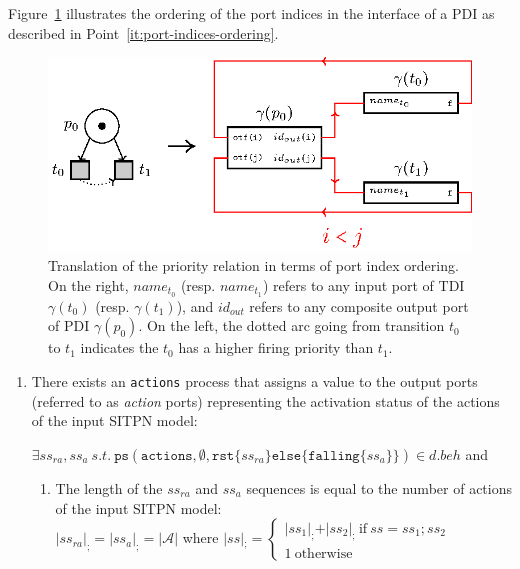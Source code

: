 \begin{definition}
  \bigskip

  Figure~\ref{fig:gen-prio-order} illustrates the ordering of the port
  indices in the interface of a PDI as described in
  Point~\ref{it:port-indices-ordering}.

  \begin{figure}[h]
    \centering
    \includegraphics[keepaspectratio,width=.8\textwidth]{gen-prio-order.eps}
    \caption{Translation of the priority relation in terms of port
      index ordering. On the right, $name_{t_0}$ (resp. $name_{t_1}$)
      refers to any input port of TDI $\gamma(t_0)$
      (resp. $\gamma(t_1)$), and $id_{out}$ refers to any composite
      output port of PDI $\gamma(p_0)$. On the left, the dotted arc
      going from transition $t_0$ to $t_1$ indicates the $t_0$ has a
      higher firing priority than $t_1$. }
    \label{fig:gen-prio-order}
  \end{figure}

  \begin{enumerate}[resume]
  \item\label{it:actions} There exists an \texttt{actions} process
    that assigns a value to the output ports (referred to as
    \textit{action} ports) representing the activation status of the
    actions of the input SITPN model:
    
    $\exists{}ss_{ra},ss_{a}~s.t.~\mathtt{ps}(\mathtt{actions},\emptyset,\mathtt{rst}\{ss_{ra}\}\mathtt{else}\{\mathtt{falling}\{ss_a\}\})\in{}d.beh$
    and
    \begin{enumerate}
    \item The length of the $ss_{ra}$ and $ss_{a}$ sequences is equal
      to the number of actions of the input SITPN model:\\
      $\vert{}ss_{ra}\vert_{;}=\vert{}ss_a\vert_{;}=\vert\mathcal{A}\vert$
      where $\vert{}ss\vert{}_{;}=
      \begin{cases}
        \vert{}ss_1\vert_{;}+\vert{}ss_2\vert_{;}~\mathrm{if}~ss=ss_1;ss_2 \\
        1~\mathrm{otherwise}
      \end{cases}
      $
      

\end{enumerate}
\end{enumerate}
\end{definition}
